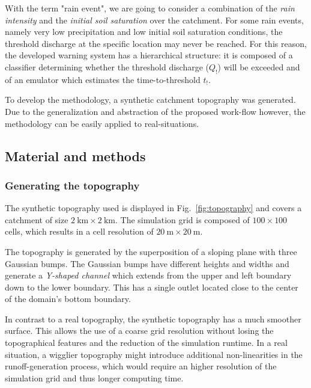 With the term "rain event", we are going to consider a combination of the \emph{rain intensity} and the \emph{initial soil saturation} over the catchment. 
For some rain events, namely very low precipitation and low initial soil saturation conditions, the threshold discharge at the specific location may never be reached.
For this reason, the developed warning system has a hierarchical structure: it is composed of a classifier determining whether the threshold discharge ($Q_!$) will be exceeded and of an emulator which estimates the time-to-threshold $t_!$.

To develop the methodology, a synthetic catchment topography was generated. Due to the generalization and abstraction of the proposed work-flow however, the methodology can be easily applied to real-situations. 

\subsection{Material and methods}
\subsubsection{Generating the topography}

The synthetic topography used is displayed in Fig.~\ref{fig:topography} and covers a catchment of size $\SI{2}{\kilo\meter} \times \SI{2}{\kilo\meter}$. 
The simulation grid is composed of $\num{100} \times \num{100}$ cells, which results in a cell resolution of $\SI{20}{\meter} \times \SI{20}{\meter}.$

The topography is generated by the superposition of a sloping plane with three Gaussian bumps.
The Gaussian bumps have different heights and widths and generate a \emph{Y-shaped channel} which extends from the upper and left boundary down to the lower boundary.
This has a single outlet located close to the center of the domain's bottom boundary.

In contrast to a real topography, the synthetic topography has a much smoother surface. This allows the use of a coarse grid resolution without losing the topographical features and the reduction of the simulation runtime. 
In a real situation, a wigglier topography might introduce additional non-linearities in the runoff-generation process, which would require an higher resolution of the simulation grid and thus longer computing time.

